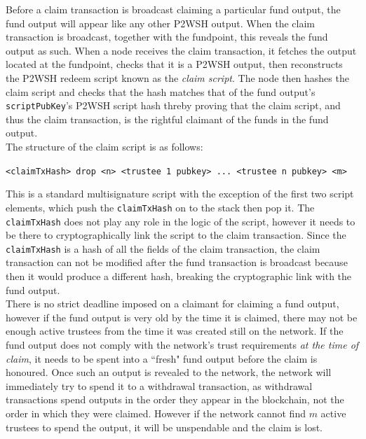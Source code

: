 \documentclass{report}
\begin{document}
			Before a claim transaction is broadcast claiming a particular fund output, the fund output will appear like any other P2WSH output. When the claim transaction is broadcast, together with the fundpoint, this reveals the fund output as such. When a node receives the claim transaction, it fetches the output located at the fundpoint, checks that it is a P2WSH output, then reconstructs the P2WSH redeem script known as the \textit{claim script}. The node then hashes the claim script and checks that the hash matches that of the fund output's \texttt{scriptPubKey}'s P2WSH script hash threby proving that the claim script, and thus the claim transaction, is the rightful claimant of the funds in the fund output. \\
			
			The structure of the claim script is as follows:
			
			\begin{center}
				\texttt{<claimTxHash> drop <n> <trustee 1 pubkey> ... <trustee n pubkey> <m>}
			\end{center}
			
			This is a standard multisignature script with the exception of the first two script elements, which push the \texttt{claimTxHash} on to the stack then pop it. The \texttt{claimTxHash} does not play any role in the logic of the script, however it needs to be there to cryptographically link the script to the claim transaction. Since the \texttt{claimTxHash} is a hash of all the fields of the claim transaction, the claim transaction can not be modified after the fund transaction is broadcast because then it would produce a different hash, breaking the cryptographic link with the fund output. \\
			
			There is no strict deadline imposed on a claimant for claiming a fund output, however if the fund output is very old by the time it is claimed, there may not be enough active trustees from the time it was created still on the network. If the fund output does not comply with the network's trust requirements \textit{at the time of claim}, it needs to be spent into a ``fresh" fund output before the claim is honoured. Once such an output is revealed to the network, the network will immediately try to spend it to a withdrawal transaction, as withdrawal transactions spend outputs in the order they appear in the blockchain, not the order in which they were claimed. However if the network cannot find $m$ active trustees to spend the output, it will be unspendable and the claim is lost.
\end{document}
